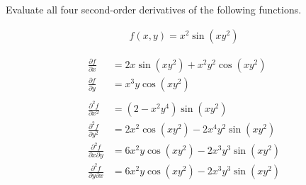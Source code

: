 Evaluate all four second-order derivatives of the following functions.

\begin{align*}
    f(x, y) = x^2\sin(xy^2)
\end{align*}

\begin{solution}
\begin{align*}
    \frac{\partial f}{\partial x} &= 2x\sin(xy^2) + x^2y^2\cos(xy^2) \\
    \frac{\partial f}{\partial y} &= x^3y\cos(xy^2) \\
    \\
    \frac{\partial^2 f}{\partial x^2} &= \left(2 - x^2y^4\right)\sin(xy^2) \\
    \frac{\partial^2 f}{\partial y^2} &= 2x^2\cos(xy^2) - 2x^4y^2\sin(xy^2) \\
    \frac{\partial^2 f}{\partial x \partial y} &= 6x^2y\cos(xy^2) - 2x^3y^3\sin(xy^2) \\
    \frac{\partial^2 f}{\partial y \partial x} &= 6x^2y\cos(xy^2) - 2x^3y^3\sin(xy^2) \\
\end{align*}
\end{solution}